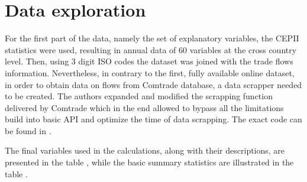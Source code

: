 \documentclass{Trade_template}
\numberwithin{equation}{section}
\begin{document}
\chapter{Data exploration}

For the first part of the data, namely the set of explanatory variables, the CEPII statistics were used, resulting in annual data of 60 variables at the cross country level. Then, using 3 digit ISO codes the dataset was joined with the trade flows information. Nevertheless, in contrary to the first, fully available online dataset, in order to obtain data on flows from Comtrade database, a data scrapper needed to be created. The authors expanded and modified the scrapping function delivered by Comtrade which in the end allowed to bypass all the limitations build into basic API and optimize the time of data scrapping. The exact code can be found in . 

The final variables used in the calculations, along with their descriptions, are presented in the table , while the basic summary statistics are illustrated in the table .

\newpage 
\end{document}
